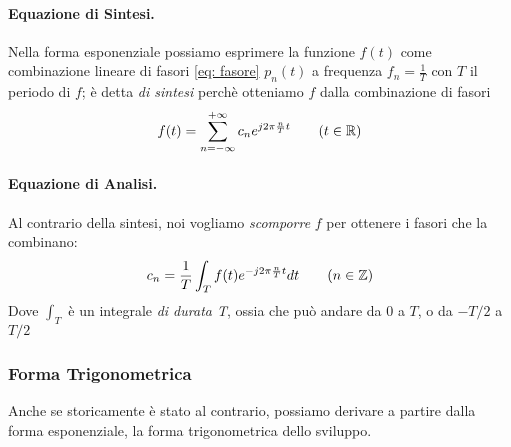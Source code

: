 \paragraph{Equazione di Sintesi.}Nella forma esponenziale possiamo esprimere la funzione $f(t)$ come combinazione lineare di fasori \eqref{eq: fasore} $p_n(t)$ a
frequenza $f_n = \frac{1}{T}$ con $T$ il periodo di $f$; è detta \textit{di sintesi} perchè otteniamo $f$ dalla combinazione di fasori
\begin{equation}
    f(t) = \sum_{n = -\infty}^{+\infty} c_n e^{j2\pi \frac{n}{T} t}  \tag{$t \in \mathbb{R}$}
\end{equation}

\paragraph{Equazione di Analisi.} Al contrario della sintesi, noi vogliamo \textit{scomporre} $f$ per ottenere i fasori che la combinano:
\begin{equation}
    c_n = \frac{1}{T} \int_{T} f(t)e^{-j2\pi \frac{n}{T}t} dt \tag{$n \in \mathbb{Z}$}
\end{equation}
Dove $\int_{T}$ è un integrale \textit{di durata T}, ossia che può andare da $0$ a $T$, o da $-T/2$ a $T/2$

\subsubsection{Forma Trigonometrica}
Anche se storicamente è stato al contrario, possiamo derivare a partire dalla forma esponenziale, la forma trigonometrica dello sviluppo.
